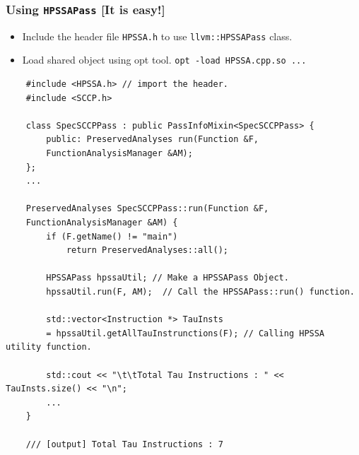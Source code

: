 \documentclass[aspectratio=169, compress]{beamer}
\begin{document}
\begin{frame}[fragile]
	\frametitle{Using \texttt{HPSSAPass} [It is easy!]}
	\begin{itemize}
		\item Include the header file \texttt{HPSSA.h} to use  \texttt{llvm::HPSSAPass} class.
		\item Load shared object using opt tool. \texttt{opt -load HPSSA.cpp.so ...} 
	\end{itemize}
	\begin{verbatim}
	#include <HPSSA.h> // import the header.
	#include <SCCP.h>
	
	class SpecSCCPPass : public PassInfoMixin<SpecSCCPPass> {
		public: PreservedAnalyses run(Function &F, 
		FunctionAnalysisManager &AM);
	};
	...
	
	PreservedAnalyses SpecSCCPPass::run(Function &F, 
	FunctionAnalysisManager &AM) {
		if (F.getName() != "main")
			return PreservedAnalyses::all();
		
		HPSSAPass hpssaUtil; // Make a HPSSAPass Object.
		hpssaUtil.run(F, AM);  // Call the HPSSAPass::run() function.
		
		std::vector<Instruction *> TauInsts 
		= hpssaUtil.getAllTauInstrunctions(F); // Calling HPSSA utility function.
		
		std::cout << "\t\tTotal Tau Instructions : " << TauInsts.size() << "\n";
		...
	}
	
	/// [output] Total Tau Instructions : 7 
	\end{verbatim}
\end{frame}
\end{document}

